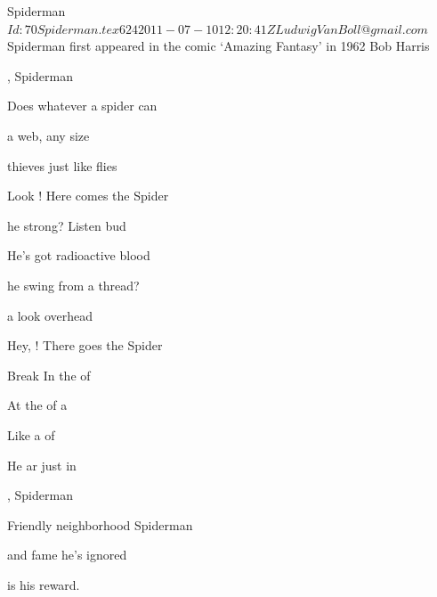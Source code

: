 \begin{SBSong}{Spiderman}
  {$Id: 70Spiderman.tex 624 2011-07-10 12:20:41Z LudwigVanBoll@gmail.com $}
  {Spiderman first appeared in the comic `Amazing Fantasy' in 1962}
  {Bob Harris}
  \begin{SBVerse}
    , Spiderman
    
    Does whatever a spider can
    
     a web, any size
    
     thieves just like flies
    
    Look ! Here comes the Spider
  \end{SBVerse}
  \begin{SBVerse}
     he strong? Listen bud
    
    He's got radioactive blood
    
     he swing from a thread?
    
     a look overhead
    
    Hey, ! There goes the Spider 
  \end{SBVerse}
  \begin{SBBracket}{Break}
    In the  of 
    
    At the  of a 
    
    Like a  of 
    
    He ar just in  
  \end{SBBracket}
  \begin{SBVerse}
    , Spiderman
    
    Friendly neighborhood Spiderman
    
     and fame he's ignored
    
     is his reward.
  \end{SBVerse}
\end{SBSong}
